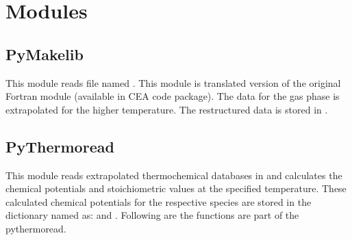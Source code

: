 \documentclass[letterpaper,10pt,english]{sphinxmanual}
\begin{document}
\begin{figure}[htbp]
\centering

\noindent{}
\end{figure}


\section{Modules}
\label{\detokenize{code_structure:modules}}

\subsection{PyMakelib}
\label{\detokenize{code_structure:pymakelib}}

This module reads  file named . This module is translated version of the original Fortran  module (available in CEA code package). The data for the gas phase is extrapolated for the higher temperature. The restructured data is stored in .


\subsection{PyThermoread}
\label{\detokenize{code_structure:pythermoread}}

This module reads extrapolated thermochemical databases in  and calculates the chemical potentials and stoichiometric values at the specified temperature. These calculated chemical potentials for the respective species are stored in the dictionary named as:  and . Following are the functions are part of the pythermoread.
\end{document}

